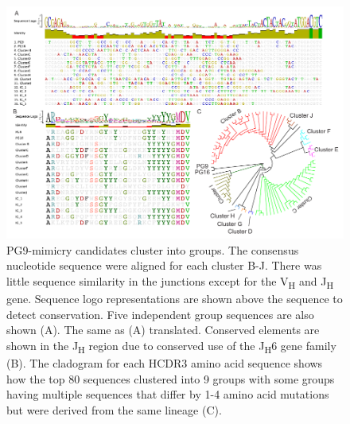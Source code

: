 \begin{figure}[!t]
   \centering
   \includegraphics[width=.99\linewidth]{images/chapter3/figure3_12.pdf} %
   \caption[PG9-Mimicry Candidates Cluster Into Groups]{PG9-mimicry candidates cluster into groups. The consensus nucleotide sequence were aligned for each cluster B-J. There was little sequence similarity in the junctions except for the V\textsubscript{H} and J\textsubscript{H}  gene. Sequence logo representations are shown above the sequence to detect conservation. Five independent group sequences are also shown (A). The same as (A) translated. Conserved elements are shown in the J\textsubscript{H} region due to conserved use of the J\textsubscript{H}6 gene family (B). The cladogram for each HCDR3 amino acid sequence shows how the top 80 sequences clustered into 9 groups with some groups having multiple sequences that differ by 1-4 amino acid mutations but were derived from the same lineage (C).}
   \label{fig:figure3_12}
\end{figure}


